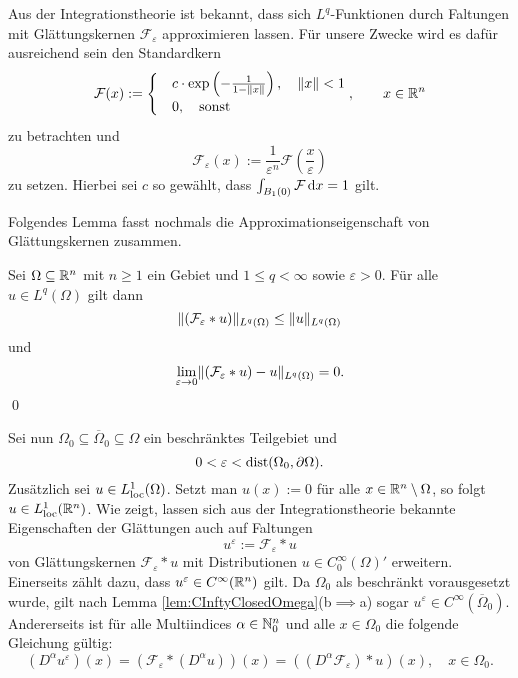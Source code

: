 Aus der Integrationstheorie ist bekannt, dass sich $L^q$-Funktionen durch Faltungen mit Glättungskernen $\mathcal{F}_\varepsilon$ approximieren lassen.
Für unsere Zwecke wird es dafür ausreichend sein den Standardkern
$$
\mathcal{F}(x) := \begin{cases}
                     & c \cdot \exp\left(-\frac{1}{1 - \lVert x \rVert}\right), \quad \lVert x \rVert < 1 \\
                     & 0, \quad  \text{sonst}
                  \end{cases}, \quad\quad x \in \mathbb{R}^n
$$
zu betrachten und
$$
\mathcal{F}_\varepsilon(x) := \frac{1}{\varepsilon^n} \mathcal{F}\left(\frac{x}{\varepsilon}\right)
$$ 
zu setzen.
Hierbei sei $c$ so gewählt, dass $\int_{B_1(0)} \mathcal{F} \, {\operatorname{d}\!{x}} = 1$ gilt.

Folgendes Lemma fasst nochmals die Approximationseigenschaft von Glättungskernen zusammen.

\begin{lem}
  \label{lem:mollification}
  Sei $\Omega \subseteq \mathbb{R}^n$ mit $n \geq 1$ ein Gebiet und $1 \leq q < \infty$ sowie $\varepsilon > 0$.
  Für alle $u \in L^q(\Omega)$ gilt dann
  $$
  \lVert (\mathcal{F}_\varepsilon \ast u) \rVert_{L^q(\Omega)} \leq  \lVert u \rVert_{L^q(\Omega)}
  $$
  und
  \begin{displaymath}
    \lim_{\varepsilon \to 0} \lVert (\mathcal{F}_\varepsilon \ast u) - u \rVert_{L^q(\Omega)} = 0. 
  \end{displaymath}
  \qed
\end{lem}

Sei nun $\Omega_0 \subseteq \overline\Omega_0 \subseteq \Omega$ ein beschränktes Teilgebiet und
\begin{equation}
  \label{eq:convolutionEpsilon}
  0 < \varepsilon < \operatorname{dist}(\Omega_0, \partial\Omega).
\end{equation}
Zusätzlich sei $u \in L^1_{\operatorname{loc}}(\Omega)$.
Setzt man $u(x) := 0$ für alle $x \in \mathbb{R}^n \setminus \Omega$, so folgt $u \in L^1_{\operatorname{loc}}(\mathbb{R}^n)$.
Wie \cite[S.171, Theorem 6.30(b)]{rudin1991fa} zeigt, lassen sich aus der Integrationstheorie bekannte Eigenschaften der Glättungen auch auf Faltungen 
$$
u^\varepsilon := \mathcal{F}_\varepsilon \ast u
$$
von Glättungskernen $\mathcal{F}_\varepsilon \ast u$ mit Distributionen $u \in C_0^\infty(\Omega)'$ erweitern.
Einerseits zählt dazu, dass $u^\varepsilon \in C^\infty(\mathbb{R}^n)$ gilt.
Da $\Omega_0$ als beschränkt vorausgesetzt wurde, gilt nach Lemma \ref{lem:CInftyClosedOmega}(b$\implies$a) sogar $u^\varepsilon \in C^\infty(\overline\Omega_0)$.
Andererseits ist für alle Multiindices $\alpha \in \mathbb{N}_0^n$ und alle $x \in \Omega_0$ die folgende Gleichung gültig:
\begin{equation}
  \label{eq:convolutionDiff}
  (D^\alpha u^\varepsilon)(x) 
  = (\mathcal{F}_\varepsilon \ast (D^\alpha u))(x)
  = ( (D^\alpha \mathcal{F}_\varepsilon) \ast u)(x), \quad x \in \Omega_0.
\end{equation}

